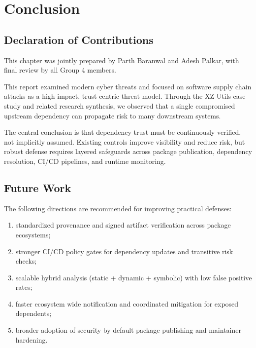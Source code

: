 \chapter{Conclusion}
\label{ch:conclusion}

\section*{Declaration of Contributions}
This chapter was jointly prepared by Parth Baranwal and Adesh Palkar,
with final review by all Group 4 members.

This report examined modern cyber threats and focused on software supply chain attacks
as a high impact, trust centric threat model. Through the XZ Utils case study and related
research synthesis, we observed that a single compromised upstream dependency can propagate
risk to many downstream systems.

The central conclusion is that dependency trust must be continuously verified, not implicitly
assumed. Existing controls improve visibility and reduce risk, but robust defense requires
layered safeguards across package publication, dependency resolution, CI/CD pipelines,
and runtime monitoring.

\section{Future Work}

The following directions are recommended for improving practical defenses:

\begin{enumerate}
\item standardized provenance and signed artifact verification across package ecosystems;
\item stronger CI/CD policy gates for dependency updates and transitive risk checks;
\item scalable hybrid analysis (static + dynamic + symbolic) with low false positive rates;
\item faster ecosystem wide notification and coordinated mitigation for exposed dependents;
\item broader adoption of security by default package publishing and maintainer hardening.
\end{enumerate}

